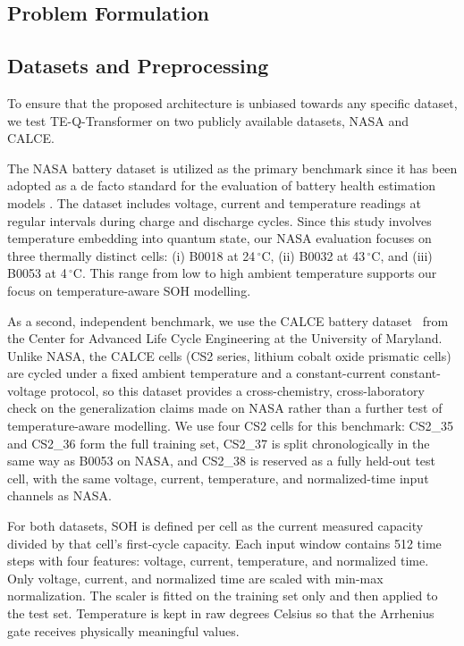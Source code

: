 \documentclass[a4paper,fleqn]{cas-sc}
\begin{document}
\subsection{Problem Formulation}\label{sec:problem}

\subsection{Datasets and Preprocessing}\label{sec:datasets}
To ensure that the proposed architecture is unbiased towards any specific dataset, we test TE-Q-Transformer on two publicly available datasets, NASA and CALCE.

The NASA battery dataset \cite{saha2007battery} is utilized as the primary benchmark since it has been adopted as a de facto standard for the evaluation of battery health estimation models \citep{komarsofla2026}. The dataset includes voltage, current and temperature readings at regular intervals during charge and discharge cycles. Since this study involves temperature embedding into quantum state, our NASA evaluation focuses on three thermally distinct cells: (i) B0018 at 24\,$^\circ$C, (ii) B0032 at 43\,$^\circ$C, and (iii) B0053 at 4\,$^\circ$C. This range from low to high ambient temperature supports our focus on temperature-aware SOH modelling.

As a second, independent benchmark, we use the CALCE battery dataset~\citep{w9rg-7173-25} from the Center for Advanced Life Cycle Engineering at the University of Maryland. Unlike NASA, the CALCE cells (CS2 series, lithium cobalt oxide prismatic cells) are cycled under a fixed ambient temperature and a constant-current constant-voltage protocol, so this dataset provides a cross-chemistry, cross-laboratory check on the generalization claims made on NASA rather than a further test of temperature-aware modelling. We use four CS2 cells for this benchmark: CS2\_35 and CS2\_36 form the full training set, CS2\_37 is split chronologically in the same way as B0053 on NASA, and CS2\_38 is reserved as a fully held-out test cell, with the same voltage, current, temperature, and normalized-time input channels as NASA.

For both datasets, SOH is defined per cell as the current measured capacity divided by that cell's first-cycle capacity. Each input window contains 512 time steps with four features: voltage, current, temperature, and normalized time. Only voltage, current, and normalized time are scaled with min-max normalization. The scaler is fitted on the training set only and then applied to the test set. Temperature is kept in raw degrees Celsius so that the Arrhenius gate receives physically meaningful values.
\end{document}
